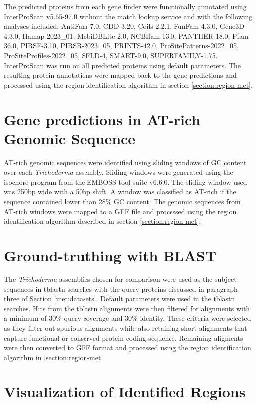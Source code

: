 The predicted proteins from each gene finder were functionally
annotated using InterProScan
v5.65-97.0\cite{10.1093/bioinformatics/btu031} without the match
lookup service and with the following analyses included: AntiFam-7.0,
CDD-3.20, Coils-2.2.1, FunFam-4.3.0, Gene3D-4.3.0, Hamap-2023\_01,
MobiDBLite-2.0, NCBIfam-13.0, PANTHER-18.0, Pfam-36.0, PIRSF-3.10,
PIRSR-2023\_05, PRINTS-42.0, ProSitePatterns-2022\_05,
ProSiteProfiles-2022\_05, SFLD-4, SMART-9.0,
SUPERFAMILY-1.75. InterProScan was run on all predicted proteins using
default parameters. The resulting protein annotations were mapped back
to the gene predictions and processed using the region identification
algorithm in section \ref{section:region-met}.

\section{Gene predictions in AT-rich Genomic Sequence}
\label{met:atrich}
AT-rich genomic sequences were identified using sliding windows of GC
content over each \textit{Trichoderma} assembly. Sliding windows were
generated using the isochore program from the EMBOSS tool suite
v6.6.0\cite{Rice2000}. The sliding window used was 250bp wide with a
50bp shift. A window was classified as AT-rich if the sequence
contained lower than 28\% GC content. The genomic sequences from
AT-rich windows were mapped to a GFF file and processed using the
region identification algorithm described in section
\ref{section:region-met}.

\section{Ground-truthing with BLAST}

The \textit{Trichoderma} assemblies chosen for comparison were used as
the subject sequences in tblastn searches with the query proteins
discussed in paragraph three of Section \ref{met:datasets}. Default
parameters were used in the tblastn searches. Hits from the tblastn
alignments were then filtered for alignments with a minimum of 30\%
query coverage and 30\% identity. These criteria were selected as they
filter out spurious alignments while also retaining short alignments
that capture functional or conserved protein coding
sequence. Remaining aligments were then converted to GFF format and processed using the region identification algorithm in \ref{section:region-met}

\section{Visualization of Identified Regions}

